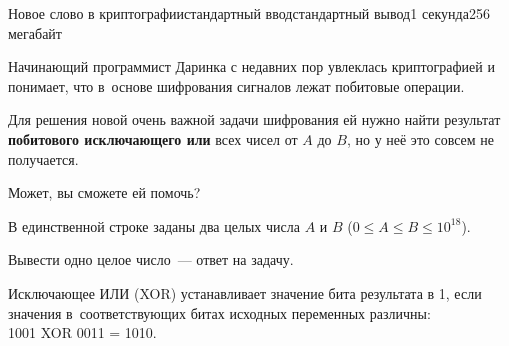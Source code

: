 \begin{problem}{Новое слово в криптографии}{стандартный ввод}{стандартный вывод}{1 секунда}{256 мегабайт}

Начинающий программист Даринка с недавних пор увлеклась криптографией и понимает, что в~основе шифрования сигналов лежат побитовые операции. 

Для решения новой очень важной задачи шифрования ей нужно найти результат \textbf{побитового исключающего или} всех чисел от $A$ до $B$, но у неё это совсем не получается.

Может, вы сможете ей помочь?

\InputFile
В единственной строке заданы два целых числа $A$ и $B$ ($0 \leq A \leq B \leq 10^{18}$).

\OutputFile
Вывести одно целое число~--- ответ на задачу.

\Examples

\begin{example}
%
%
\end{example}

\Note
Исключающее ИЛИ (XOR) устанавливает значение бита результата в 1, если значения в~соответствующих битах исходных переменных различны:\\
1001 XOR 0011 = 1010.

\end{problem}

